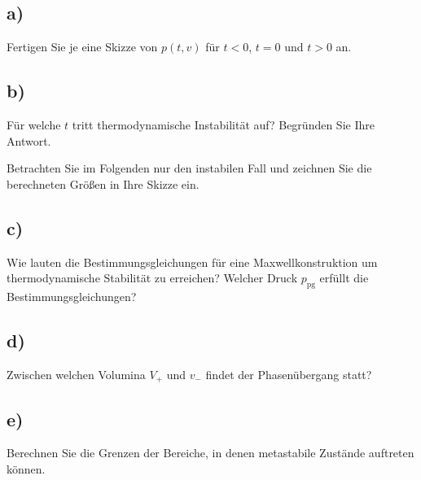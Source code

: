 \subsection{a)}
Fertigen Sie je eine Skizze von $p(t,v)$ für $t<0$, $t=0$ und $t>0$ an.

\subsection{b)}
Für welche $t$ tritt thermodynamische Instabilität auf?
Begründen Sie Ihre Antwort.


Betrachten Sie im Folgenden nur den instabilen Fall und zeichnen Sie die berechneten Größen in Ihre Skizze ein.

\subsection{c)}
Wie lauten die Bestimmungsgleichungen für eine Maxwellkonstruktion um thermodynamische Stabilität zu erreichen?
Welcher Druck $p_\text{pg}$ erfüllt die Bestimmungsgleichungen?

\subsection{d)}
Zwischen welchen Volumina $V_+$ und $v_-$ findet der Phasenübergang statt?

\subsection{e)}
Berechnen Sie die Grenzen der Bereiche, in denen metastabile Zustände auftreten können.


